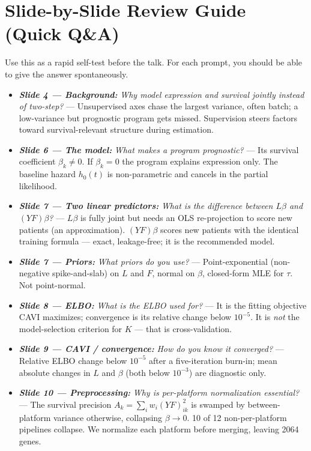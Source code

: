 \documentclass[11pt]{article}
\newcommand{\actioncue}[1]{\textit{\textbf{#1}}}
\begin{document}
\section*{Slide-by-Slide Review Guide (Quick Q\&A)}

Use this as a rapid self-test before the talk. For each prompt, you should be able to give the answer
spontaneously.

\begin{itemize}
\item \actioncue{Slide 4 --- Background:} \emph{Why model expression and survival jointly instead of two-step?}
--- Unsupervised axes chase the largest variance, often batch; a low-variance but prognostic program
gets missed. Supervision steers factors toward survival-relevant structure during estimation.

\item \actioncue{Slide 6 --- The model:} \emph{What makes a program prognostic?} --- Its survival coefficient
$\beta_k \neq 0$. If $\beta_k = 0$ the program explains expression only. The baseline hazard $h_0(t)$
is non-parametric and cancels in the partial likelihood.

\item \actioncue{Slide 7 --- Two linear predictors:} \emph{What is the difference between $L\beta$ and
$(YF)\beta$?} --- $L\beta$ is fully joint but needs an OLS re-projection to score new patients (an
approximation). $(YF)\beta$ scores new patients with the identical training formula --- exact,
leakage-free; it is the recommended model.

\item \actioncue{Slide 7 --- Priors:} \emph{What priors do you use?} --- Point-exponential (non-negative
spike-and-slab) on $L$ and $F$, normal on $\beta$, closed-form MLE for $\tau$. Not point-normal.

\item \actioncue{Slide 8 --- ELBO:} \emph{What is the ELBO used for?} --- It is the fitting objective CAVI
maximizes; convergence is its relative change below $10^{-5}$. It is \emph{not} the model-selection
criterion for $K$ --- that is cross-validation.

\item \actioncue{Slide 9 --- CAVI / convergence:} \emph{How do you know it converged?} --- Relative ELBO change
below $10^{-5}$ after a five-iteration burn-in; mean absolute changes in $L$ and $\beta$ (both below
$10^{-3}$) are diagnostic only.

\item \actioncue{Slide 10 --- Preprocessing:} \emph{Why is per-platform normalization essential?} --- The survival
precision $A_k = \sum_i w_i (YF)_{ik}^2$ is swamped by between-platform variance otherwise, collapsing
$\beta \to 0$. 10 of 12 non-per-platform pipelines collapse. We normalize each platform before
merging, leaving 2064 genes.


\end{itemize}
\end{document}
